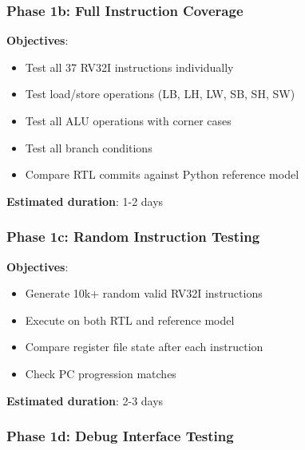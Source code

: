 \subsubsection{Phase 1b: Full Instruction Coverage}\label{cr:fix:cpu-verification-ready:phase-1b-full-instruction-coverage}

\begin{record}

\textbf{Objectives}:

\begin{itemize}
\tightlist
\item
  Test all 37 RV32I instructions individually
\item
  Test load/\allowbreak{}store operations (LB, LH, LW, SB, SH, SW)
\item
  Test all ALU operations with corner cases
\item
  Test all branch conditions
\item
  Compare RTL commits against Python reference model
\end{itemize}

\textbf{Estimated duration}: 1-2 days

\end{record}

\subsubsection{Phase 1c: Random Instruction Testing}\label{cr:fix:cpu-verification-ready:phase-1c-random-instruction-testing}

\begin{record}

\textbf{Objectives}:

\begin{itemize}
\tightlist
\item
  Generate 10k+ random valid RV32I instructions
\item
  Execute on both RTL and reference model
\item
  Compare register file state after each instruction
\item
  Check PC progression matches
\end{itemize}

\textbf{Estimated duration}: 2-3 days

\end{record}

\subsubsection{Phase 1d: Debug Interface Testing}\label{cr:fix:cpu-verification-ready:phase-1d-debug-interface-testing}

